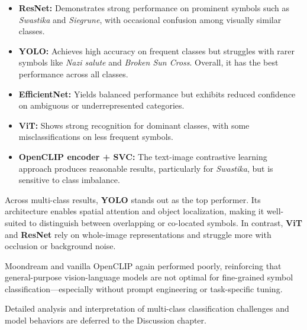 \begin{itemize}
  \item \textbf{\ac{ResNet}:} Demonstrates strong performance on prominent symbols such as \textit{Swastika} and
  \textit{Siegrune}, with occasional confusion among visually similar classes.
  \item \textbf{\ac{YOLO}:} Achieves high accuracy on frequent classes but struggles with rarer symbols like
  \textit{Nazi salute} and \textit{Broken Sun Cross}. Overall, it has the best performance across all classes.
  \item \textbf{EfficientNet:} Yields balanced performance but exhibits reduced confidence on ambiguous or
  underrepresented categories.
  \item \textbf{\ac{ViT}:} Shows strong recognition for dominant classes, with some misclassifications on less
  frequent symbols.
  \item \textbf{OpenCLIP encoder + \ac{SVC}:} The text-image contrastive learning approach produces reasonable results,
  particularly for \textit{Swastika}, but is sensitive to class imbalance.
\end{itemize}







Across multi-class results, \textbf{YOLO} stands out as the top performer. Its architecture enables spatial
attention and object localization, making it well-suited to distinguish between overlapping or co-located symbols.
In contrast, \textbf{ViT} and \textbf{ResNet} rely on whole-image representations and struggle more with occlusion
or background noise.

Moondream and vanilla OpenCLIP again performed poorly, reinforcing that general-purpose vision-language models are
not optimal for fine-grained symbol classification—especially without prompt engineering or task-specific tuning.

Detailed analysis and interpretation of multi-class classification challenges and model behaviors are deferred to
the Discussion chapter.